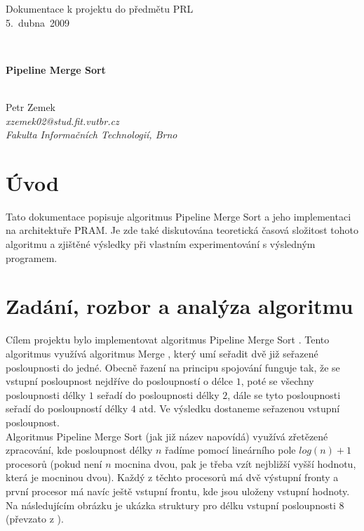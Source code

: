 \documentclass[11pt,a4paper]{article}
\begin{document}
\noindent
\begin{small}Dokumentace k projektu do předmětu PRL \\ 5.~dubna~2009\end{small} \\

\begin{center}
	\begin{large}\textbf{Pipeline Merge Sort}\end{large} \\
	\vspace{0.4cm}
	Petr Zemek \\
	\textit{xzemek02@stud.fit.vutbr.cz} \\
	\textit{Fakulta Informačních Technologií, Brno} \\
\end{center}

\section{Úvod}

Tato dokumentace popisuje algoritmus Pipeline Merge Sort a jeho implementaci
na architektuře PRAM. Je zde také diskutována teoretická časová složitost tohoto
algoritmu a zjištěné výsledky při vlastním experimentování s výsledným programem.

\section{Zadání, rozbor a analýza algoritmu}

Cílem projektu bylo implementovat algoritmus Pipeline Merge Sort \cite{1}.
Tento algoritmus využívá algoritmus Merge \cite{2}, který umí
seřadit dvě již seřazené posloupnosti do jedné. Obecně řazení na principu
spojování funguje tak, že se vstupní posloupnost nejdříve 
do posloupností o délce $1$, poté se všechny posloupnosti délky $1$ seřadí
do posloupnosti délky $2$, dále se tyto posloupnosti seřadí do posloupností
délky $4$ atd. Ve výsledku dostaneme seřazenou vstupní posloupnost. \\

\noindent
Algoritmus Pipeline Merge Sort (jak již název napovídá) využívá zřetězené zpracování,
kde posloupnost délky $n$ řadíme pomocí lineárního pole $log(n) + 1$ procesorů (pokud není $n$
mocnina dvou, pak je třeba vzít nejbližší vyšší hodnotu, která je mocninou dvou).
Každý z těchto procesorů má dvě výstupní fronty a první procesor má navíc ještě
vstupní frontu, kde jsou uloženy vstupní hodnoty. Na následujícím obrázku
je ukázka struktury pro délku vstupní posloupnosti $8$ (převzato z \cite{1}).
\end{document}

